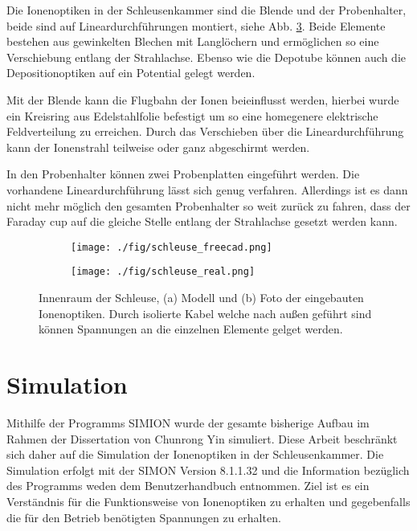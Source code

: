 Die Ionenoptiken in der Schleusenkammer sind die Blende und der Probenhalter, beide sind auf Lineardurchführungen montiert, siehe Abb. \ref{fig:schleuse_innen}.
Beide Elemente bestehen aus gewinkelten Blechen mit Langlöchern und ermöglichen so eine Verschiebung entlang der Strahlachse.
Ebenso wie die Depotube können auch die Depositionoptiken auf ein Potential gelegt werden.

Mit der Blende kann die Flugbahn der Ionen beieinflusst werden, hierbei wurde ein Kreisring aus Edelstahlfolie befestigt um so eine homegenere elektrische Feldverteilung zu erreichen.
Durch das Verschieben über die Lineardurchführung kann der Ionenstrahl teilweise oder ganz abgeschirmt werden.

In den Probenhalter können zwei Probenplatten eingeführt werden.
Die vorhandene Lineardurchführung lässt sich genug verfahren.
Allerdings ist es dann nicht mehr möglich den gesamten Probenhalter so weit zurück zu fahren, dass der Faraday cup auf die gleiche Stelle entlang der Strahlachse gesetzt werden kann.
\begin{figure}
    \begin{subfigure}[t]{0.478\textwidth}
      \texttt{[image: ./fig/schleuse\_freecad.png]}
      \caption{}
      \label{fig:schleuse_freecad}
    \end{subfigure}\hfill
    \begin{subfigure}[t]{0.475\textwidth}
      \texttt{[image: ./fig/schleuse\_real.png]}
      \caption{}
      \label{fig:schleuse_real}
    \end{subfigure}
    \caption{Innenraum der Schleuse, (a) Modell und (b) Foto der eingebauten Ionenoptiken. Durch isolierte Kabel welche nach außen geführt sind können Spannungen an die einzelnen Elemente gelget werden.}
    \label{fig:schleuse_innen}
\end{figure}


\section{Simulation}
Mithilfe der Programms SIMION \cite{Manura.2008} wurde der gesamte bisherige Aufbau im Rahmen der Dissertation von Chunrong Yin \cite{Yin.2007} simuliert.
Diese Arbeit beschränkt sich daher auf die Simulation der Ionenoptiken in der Schleusenkammer.
Die Simulation erfolgt mit der SIMON Version 8.1.1.32 und die Information bezüglich des Programms weden dem Benutzerhandbuch entnommen.
Ziel ist es ein Verständnis für die Funktionsweise von Ionenoptiken zu erhalten und gegebenfalls die für den Betrieb benötigten Spannungen zu erhalten.

